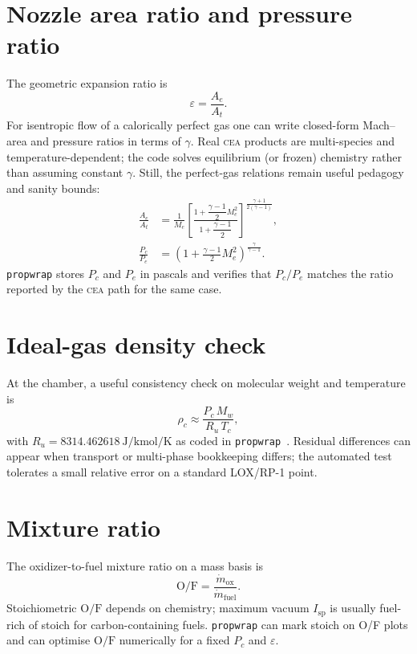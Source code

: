 \documentclass[11pt,a4paper]{report}
\newcommand{\pw}{\texttt{propwrap}}
\newcommand{\cea}{\textsc{cea}}
\newcommand{\of}{\mathrm{O/F}}
\newcommand{\Isp}{I_{\mathrm{sp}}}
\newcommand{\Pc}{P_{c}}
\newcommand{\Pe}{P_{e}}
\newcommand{\eps}{\varepsilon}
\begin{document}
\section{Nozzle area ratio and pressure ratio}

The geometric expansion ratio is
\begin{equation}
  \eps = \frac{A_e}{A_t}.
  \label{eq:eps}
\end{equation}
For isentropic flow of a calorically perfect gas one can write closed-form
Mach--area and pressure ratios in terms of $\gamma$. Real \cea{} products are
multi-species and temperature-dependent; the code solves equilibrium (or frozen)
chemistry rather than assuming constant $\gamma$. Still, the perfect-gas
relations remain useful pedagogy and sanity bounds:
\begin{align}
  \frac{A_e}{A_t}
  &= \frac{1}{M_e}\left[
      \frac{1+\dfrac{\gamma-1}{2}M_e^{2}}{1+\dfrac{\gamma-1}{2}}
     \right]^{\frac{\gamma+1}{2(\gamma-1)}},
  \label{eq:area_mach}\\[0.5em]
  \frac{\Pc}{\Pe}
  &= \left(1+\frac{\gamma-1}{2}M_e^{2}\right)^{\frac{\gamma}{\gamma-1}}.
  \label{eq:pcpe_perfect}
\end{align}
\pw{} stores $\Pc$ and $\Pe$ in pascals and verifies that $\Pc/\Pe$ matches the
ratio reported by the \cea{} path for the same case.

\section{Ideal-gas density check}

At the chamber, a useful consistency check on molecular weight and temperature
is
\begin{equation}
  \rho_c \approx \frac{\Pc\,M_w}{R_u\,T_c},
  \label{eq:rho_ig}
\end{equation}
with $R_u=\SI{8314.462618}{\joule\per\kilo\mole\per\kelvin}$ as coded in
\pw{}~\citep{codata}. Residual differences can appear when transport or
multi-phase bookkeeping differs; the automated test tolerates a small relative
error on a standard LOX/RP-1 point.

\section{Mixture ratio}

The oxidizer-to-fuel mixture ratio on a mass basis is
\begin{equation}
  \of = \frac{\dot{m}_{\mathrm{ox}}}{\dot{m}_{\mathrm{fuel}}}.
  \label{eq:of}
\end{equation}
Stoichiometric $\of$ depends on chemistry; maximum vacuum $\Isp$ is usually
fuel-rich of stoich for carbon-containing fuels. \pw{} can mark stoich on O/F
plots and can optimise $\of$ numerically for a fixed $\Pc$ and $\eps$.
\end{document}
